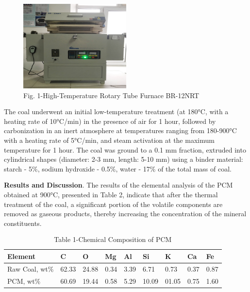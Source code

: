 \begin{figure}[H]
  \centering
  \includegraphics[width=0.5\textwidth]{assets/1089}
	\caption*{Fig. 1-High-Temperature Rotary Tube Furnace BR-12NRT}
\end{figure}

\begin{multicols}{2}
The coal underwent an initial low-temperature treatment (at 180°C, with
a heating rate of 10°C/min) in the presence of air for 1 hour, followed
by carbonization in an inert atmosphere at temperatures ranging from
180-900°C with a heating rate of 5°C/min, and steam activation at the
maximum temperature for 1 hour. The coal was ground to a 0.1 mm
fraction, extruded into cylindrical shapes (diameter: 2-3 mm, length:
5-10 mm) using a binder material: starch - 5\%, sodium hydroxide -
0.5\%, water - 17\% of the total mass of coal.

{\bfseries Results and Discussion}. The results of the elemental analysis
of the PCM obtained at 900°C, presented in Table 2, indicate that after
the thermal treatment of the coal, a significant portion of the volatile
components are removed as gaseous products, thereby increasing the
concentration of the mineral constituents.
\end{multicols}

\begin{table}[H]
\caption*{Table 1-Chemical Composition of PCM}
\centering
\begin{tabular}{|l|l|l|l|l|l|l|l|l|}
\hline
\textbf{Element} & \textbf{C} & \textbf{O} & \textbf{Mg} & \textbf{Al} & \textbf{Si} & \textbf{K} & \textbf{Ca} & \textbf{Fe} \\ \hline
Raw Coal, wt\% & 62.33 & 24.88 & 0.34 & 3.39 & 6.71 & 0.73 & 0.37 & 0.87 \\ \hline
PCM, wt\% & 60.69 & 19.44 & 0.58 & 5.29 & 10.09 & 01.05 & 0.75 & 1.60 \\ \hline
\end{tabular}
\end{table}

